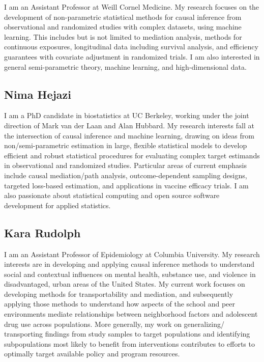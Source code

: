 \documentclass[
  12pt,
]{book}
\theoremstyle{definition}
\theoremstyle{definition}
\theoremstyle{definition}
\newcommand{\1}{\mathbbm{1}}
\begin{document}
I am an Assistant Professor at Weill Cornel Medicine. My research
focuses on the development of non-parametric statistical methods for
causal inference from observational and randomized studies with
complex datasets, using machine learning. This includes but is not
limited to mediation analysis, methods for continuous exposures,
longitudinal data including survival analysis, and efficiency
guarantees with covariate adjustment in randomized trials. I am also
interested in general semi-parametric theory, machine learning, and
high-dimensional data.

\hypertarget{nima-hejazi}{%
\subsection*{Nima Hejazi}\label{nima-hejazi}}


I am a PhD candidate in biostatistics at UC Berkeley, working under the joint
direction of Mark van der Laan and Alan Hubbard. My research interests fall at
the intersection of causal inference and machine learning, drawing on ideas from
non/semi-parametric estimation in large, flexible statistical models to develop
efficient and robust statistical procedures for evaluating complex target
estimands in observational and randomized studies. Particular areas of current
emphasis include causal mediation/path analysis, outcome-dependent sampling
designs, targeted loss-based estimation, and applications in vaccine efficacy
trials. I am also passionate about statistical computing and open source
software development for applied statistics.

\hypertarget{kara-rudolph}{%
\subsection*{Kara Rudolph}\label{kara-rudolph}}


I am an Assistant Professor of Epidemiology at Columbia University. My research
interests are in developing and applying causal inference methods to understand
social and contextual influences on mental health, substance use, and violence
in disadvantaged, urban areas of the United States. My current work focuses on
developing methods for transportability and mediation, and subsequently applying
those methods to understand how aspects of the school and peer environments
mediate relationships between neighborhood factors and adolescent drug use
across populations. More generally, my work on generalizing/ transporting
findings from study samples to target populations and identifying subpopulations
most likely to benefit from interventions contributes to efforts to optimally
target available policy and program resources.
\end{document}

